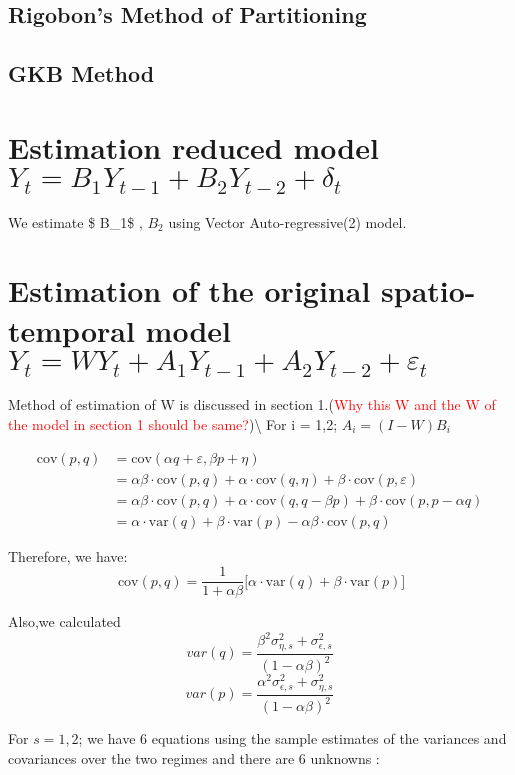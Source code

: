 \documentclass[
  12pt,
]{article}
\begin{document}
\subsection{Rigobon's Method of Partitioning}

\subsection{GKB Method}

\section{\textbf{\textcolor{DeepBlue}{Estimation reduced model $Y_t = B_1 Y_{t-1} + B_2 Y_{t-2} + \delta_t$}}}

We estimate \$ B\_1\$ , \(B_2\) using Vector Auto-regressive(2) model.

\section{\textbf{\textcolor{DeepBlue}{Estimation of the original spatio-temporal model $ Y_t = WY_t + A_1 Y_{t-1} + A_2 Y_{t-2} + \varepsilon_t $}}}

Method of estimation of W is discussed in section
1.(\textcolor{red}{Why this W and the W of the model in section 1 should be same?})\textbackslash{}
For i = 1,2; \(A_i = (I-W)B_i\)

\begin{align*}
    \text{cov}(p,q) &= \text{cov}(\alpha q + \varepsilon , \beta p + \eta)\\
    &= \alpha\beta\cdot\text{cov}(p,q) + \alpha\cdot\text{cov}(q,\eta) + \beta\cdot\text{cov}(p,\varepsilon)\\
    &= \alpha\beta\cdot\text{cov}(p,q) + \alpha\cdot\text{cov}(q,q - \beta p) + \beta\cdot\text{cov}(p,p - \alpha q)\\
    &= \alpha\cdot\text{var}(q) + \beta\cdot\text{var}(p) - \alpha\beta\cdot\text{cov}(p,q)
\end{align*}

Therefore, we have:
\[~\text{cov}(p,q) = \dfrac{1}{1+\alpha\beta}\Big[\alpha\cdot\text{var}(q) + \beta\cdot\text{var}(p)\Big] \]

Also,we calculated
\[var(q) = \frac{\beta^2 \sigma^2_{\eta,s} + \sigma^2_{\epsilon,s}}{(1-\alpha \beta)^2} \]
\[var(p) = \frac{\alpha^2 \sigma^2_{\epsilon,s} + \sigma^2_{\eta,s}}{(1-\alpha \beta)^2}\]

For \(s=1,2\); we have 6 equations using the sample estimates of the
variances and covariances over the two regimes and there are 6 unknowns
:
\end{document}
